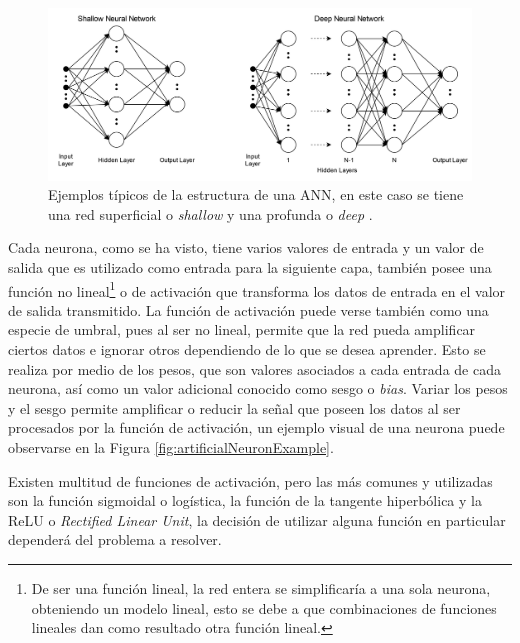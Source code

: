 \begin{figure}[h]
    \centering
    \includegraphics[width=\linewidth]{imagenes/theory/neuralNetDiagram.png}
    \caption[Ejemplos de la estructura de una ANN]{Ejemplos típicos de la estructura de una ANN, en este caso se tiene una red superficial o \textit{shallow} y una profunda o \textit{deep} \cite{annPictureSource}.}
    \label{fig:annExample}
\end{figure}

Cada neurona, como se ha visto, tiene varios valores de entrada y un valor de salida que es utilizado como entrada para la siguiente capa, también posee una función no lineal\footnote{De ser una función lineal, la red entera se simplificaría a una sola neurona, obteniendo un modelo lineal, esto se debe a que combinaciones de funciones lineales dan como resultado otra función lineal.} o de activación que transforma los datos de entrada en el valor de salida transmitido. La función de activación puede verse también como una especie de umbral, pues al ser no lineal, permite que la red pueda amplificar ciertos datos e ignorar otros dependiendo de lo que se desea aprender. Esto se realiza por medio de los pesos, que son valores asociados a cada entrada de cada neurona, así como un valor adicional conocido como sesgo o \textit{bias}. Variar los pesos y el sesgo permite amplificar o reducir la señal que poseen los datos al ser procesados por la función de activación, un ejemplo visual de una neurona puede observarse en la Figura \ref{fig:artificialNeuronExample}. 

Existen multitud de funciones de activación, pero las más comunes y utilizadas son la función sigmoidal o logística, la función de la tangente hiperbólica y la ReLU o \textit{Rectified Linear Unit}, la decisión de utilizar alguna función en particular dependerá del problema a resolver.

